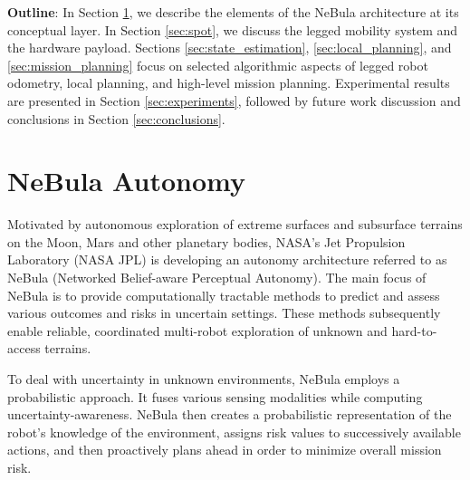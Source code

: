 \documentclass[letterpaper, 10pt, conference]{ieeeconf}      %
\newcommand{\ph}[1]{{\textbf{#1}:}} %
\newcommand{\rev}[1]{{\color{blue}#1}} %
\begin{document}
\ph{Outline}
In Section \ref{sec:nebula}, we describe the elements of the NeBula architecture at its conceptual layer. 
In Section \ref{sec:spot}, we discuss the legged mobility system and the hardware payload. Sections \ref{sec:state_estimation}, \ref{sec:local_planning}, and \ref{sec:mission_planning} focus on selected algorithmic aspects of legged robot odometry, local planning, and high-level mission planning.
Experimental results are presented in Section \ref{sec:experiments}, followed by future work discussion and conclusions in Section \ref{sec:conclusions}.

\section{NeBula Autonomy}\label{sec:nebula}
Motivated by autonomous exploration of extreme surfaces and subsurface terrains on the \rev{Moon, Mars} and other planetary bodies, \rev{NASA's Jet Propulsion Laboratory (NASA JPL)} is developing an autonomy architecture referred to as NeBula (Networked Belief-aware Perceptual Autonomy). 
The main focus of NeBula is to provide computationally tractable methods to predict and assess various outcomes and risks in uncertain settings. \rev{These methods subsequently} enable reliable, coordinated multi-robot exploration of unknown and hard-to-access terrains. %

\rev{To deal with uncertainty in unknown environments, NeBula employs a probabilistic approach.
It fuses various sensing modalities %
\rev{while computing} uncertainty-awareness. NeBula then creates a probabilistic representation of the robot's knowledge of the environment, assigns risk values to \rev{successively} available actions, \rev{and then proactively plans ahead in order to minimize overall mission risk.}} %

\end{document}
